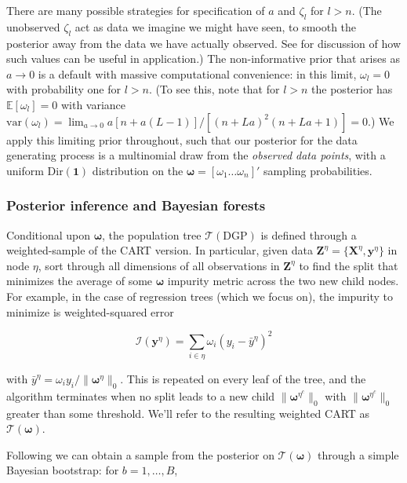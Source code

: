 \documentclass[12pt]{article}
\begin{document}
There are many possible strategies for specification of $a$ and
$\zeta_l$ for $l>n$. (The unobserved $\zeta_l$ act as data we imagine we
might have seen, to smooth the posterior away from the data we have
actually observed. See \cite{poirier_bayesian_2011} for discussion of
how such values can be useful in application.) The non-informative prior
that arises as $a\rightarrow 0$ is a default with massive computational
convenience: in this limit, $\omega_l = 0$ with probability one for
$l>n$. (To see this, note that for $l>n$ the posterior has
$\mathbb{E}[\omega_l]=0$ with variance
$\mathrm{var}(\omega_l) = \lim_{a \to 0} a[n+a(L-1)]/[(n+La)^2(n+La+1)] = 0$.)
We apply this limiting prior throughout, such that our posterior for the
data generating process is a multinomial draw from the \emph{observed
data points}, with a uniform $\mathrm{Dir}(\boldsymbol{1})$ distribution
on the $\boldsymbol{\omega} = [\omega_1 \dots \omega_n]'$ sampling
probabilities.

    \subsubsection{Posterior inference and Bayesian
forests}\label{posterior-inference-and-bayesian-forests}

Conditional upon $\boldsymbol{\omega}$, the population tree
$\mathcal{T}(\text{DGP})$ is defined through a weighted-sample of the
CART version. In particular, given data
$\mathbf{Z}^\eta = \{\mathbf{X}^\eta,\mathbf{y}^\eta\}$ in node $\eta$,
sort through all dimensions of all observations in $\mathbf{Z}^\eta$ to
find the split that minimizes the average of some $\boldsymbol{\omega}$
impurity metric across the two new child nodes. For example, in the case
of regression trees (which we focus on), the impurity to minimize is
weighted-squared error

\begin{equation}
\mathcal{I}(\mathbf{y}^\eta) = \sum_{i\in \eta} \omega_i (y_i - \bar y^\eta )^2
\end{equation}

with $\bar y^\eta =\omega_i y_i/\|\boldsymbol{\omega}^\eta\|_0$. This is
repeated on every leaf of the tree, and the algorithm terminates when no
split leads to a new child $\|\boldsymbol{\omega}^{\eta^c}\|_0$ with
$\|\boldsymbol{\omega}^{\eta^{c}}\|_0$ greater than some threshold.
We'll refer to the resulting weighted CART as
$\mathcal{T}(\boldsymbol{\omega})$.

Following \cite{rubin_bayesian_1981} we can obtain a sample from the
posterior on $\mathcal{T}(\boldsymbol{\omega})$ through a simple
Bayesian bootstrap: for $b=1,\dots, B$,
\end{document}
